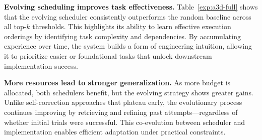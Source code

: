 \documentclass{article}
\begin{document}
\begin{table}[!h]
  \centering
  \caption{
Comparison of \ppname{} with random and evolving schedulers under top-$k$ evaluation (for $k=5,10,15,20$).
Metrics include execution success rate (exec.), format correctness, and correlation with ground truth (average and maximum).
}
  \setlength{\tabcolsep}{3pt}
  \label{exp:a3d-full}
\end{table}

\textbf{ Evolving scheduling improves task effectiveness.}
Table~\ref{exp:a3d-full} shows that the evolving scheduler consistently outperforms the random baseline across all top-$k$ thresholds. This highlights its ability to learn effective execution orderings by identifying task complexity and dependencies. By accumulating experience over time, the system builds a form of engineering intuition, allowing it to prioritize easier or foundational tasks that unlock downstream implementation success.


\textbf{ More resources lead to stronger generalization.}
As more budget is allocated, both schedulers benefit, but the evolving strategy shows greater gains. Unlike self-correction approaches that plateau early, the evolutionary process continues improving by retrieving and refining past attempts—regardless of whether initial trials were successful. This co-evolution between scheduler and implementation enables efficient adaptation under practical constraints.
\end{document}
